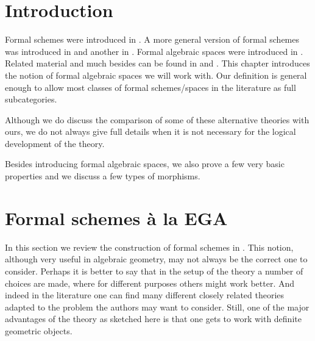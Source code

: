 \section{Introduction}
\label{formal-spaces-section-introduction}
Formal schemes were introduced in \cite{EGA}. A more general version
of formal schemes was introduced in \cite{McQuillan} and another
in \cite{Yasuda}. Formal algebraic spaces were introduced in \cite{Kn}.
Related material and much besides can be found in
\cite{Abbes} and \cite{Fujiwara-Kato}.
This chapter introduces the notion of formal algebraic spaces
we will work with. Our definition is general enough to allow most
classes of formal schemes/spaces in the literature as full subcategories.

\medskip\noindent
Although we do discuss the comparison of some of these alternative theories
with ours, we do not always give full details when it is not necessary for
the logical development of the theory.

\medskip\noindent
Besides introducing formal algebraic spaces, we also prove a few very
basic properties and we discuss a few types of morphisms.

\section{Formal schemes \`a la EGA}
\label{formal-spaces-section-formal-schemes-EGA}
In this section we review the construction of formal schemes in \cite{EGA}.
This notion, although very useful in algebraic geometry,
may not always be the correct one to consider. Perhaps it is better to say
that in the setup of the theory a number of choices are made, where for
different purposes others might work better. And indeed in the literature
one can find many different closely related theories
adapted to the problem the authors may want to consider. Still, one
of the major advantages of the theory as sketched here is that one
gets to work with definite geometric objects.

